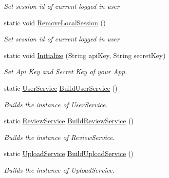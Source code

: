 \begin{DoxyCompactItemize}
\begin{DoxyCompactList}\small\item\em Set session id of current logged in user \end{DoxyCompactList}\item 
static void \hyperlink{classcom_1_1shephertz_1_1app42_1_1paas_1_1sdk_1_1csharp_1_1_app42_a_p_i_a6bca89622067894c5cdd176f111819b0}{Remove\+Local\+Session} ()
\begin{DoxyCompactList}\small\item\em Set session id of current logged in user \end{DoxyCompactList}\item 
static void \hyperlink{classcom_1_1shephertz_1_1app42_1_1paas_1_1sdk_1_1csharp_1_1_app42_a_p_i_a1d7fb5e822a3e6b3e448c03a19513eda}{Initialize} (String api\+Key, String secret\+Key)
\begin{DoxyCompactList}\small\item\em Set Api Key and Secret Key of your App. \end{DoxyCompactList}\item 
static \hyperlink{classcom_1_1shephertz_1_1app42_1_1paas_1_1sdk_1_1csharp_1_1user_1_1_user_service}{User\+Service} \hyperlink{classcom_1_1shephertz_1_1app42_1_1paas_1_1sdk_1_1csharp_1_1_app42_a_p_i_a4dee3f7f0dcb46055f94b6819ae8b7b0}{Build\+User\+Service} ()
\begin{DoxyCompactList}\small\item\em Builds the instance of User\+Service. \end{DoxyCompactList}\item 
static \hyperlink{classcom_1_1shephertz_1_1app42_1_1paas_1_1sdk_1_1csharp_1_1review_1_1_review_service}{Review\+Service} \hyperlink{classcom_1_1shephertz_1_1app42_1_1paas_1_1sdk_1_1csharp_1_1_app42_a_p_i_a3a138100ae918fe3c602dcb0b4f9fc6e}{Build\+Review\+Service} ()
\begin{DoxyCompactList}\small\item\em Builds the instance of Review\+Service. \end{DoxyCompactList}\item 
static \hyperlink{classcom_1_1shephertz_1_1app42_1_1paas_1_1sdk_1_1csharp_1_1upload_1_1_upload_service}{Upload\+Service} \hyperlink{classcom_1_1shephertz_1_1app42_1_1paas_1_1sdk_1_1csharp_1_1_app42_a_p_i_af06aee28b3d4d4d66241efe2dede39a1}{Build\+Upload\+Service} ()
\begin{DoxyCompactList}\small\item\em Builds the instance of Upload\+Service. \end{DoxyCompactList}\item 

\end{DoxyCompactItemize}
